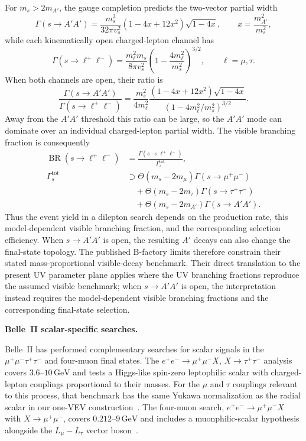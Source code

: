 \documentclass[12pt,a4paper]{article}
\begin{document}
For \(m_s>2m_{A'}\), the gauge completion predicts the two-vector partial width
\[
\Gamma(s\to A'A')
=\frac{m_s^3}{32\pi v_s^2}
\left(1-4x+12x^2\right)\sqrt{1-4x},
\qquad
x=\frac{m_{A'}^2}{m_s^2},
\]
while each kinematically open charged-lepton channel has
\[
\Gamma(s\to\ell^+\ell^-)
=\frac{m_\ell^2m_s}{8\pi v_s^2}
\left(1-\frac{4m_\ell^2}{m_s^2}\right)^{3/2},
\qquad \ell=\mu,\tau.
\]
When both channels are open, their ratio is
\[
\frac{\Gamma(s\to A'A')}{\Gamma(s\to\ell^+\ell^-)}
=
\frac{m_s^2}{4m_\ell^2}
\frac{(1-4x+12x^2)\sqrt{1-4x}}
{\left(1-4m_\ell^2/m_s^2\right)^{3/2}}.
\]
Away from the \(A'A'\) threshold this ratio can be large, so the \(A'A'\) mode can dominate over an individual charged-lepton partial width. The visible branching fraction is consequently
\[
\begin{aligned}
\operatorname{BR}(s\to\ell^+\ell^-)
&=\frac{\Gamma(s\to\ell^+\ell^-)}{\Gamma_s^{\mathrm{tot}}},\\
\Gamma_s^{\mathrm{tot}}&\supset
\Theta(m_s-2m_\mu)\Gamma(s\to\mu^+\mu^-)\\
&\quad+\Theta(m_s-2m_\tau)\Gamma(s\to\tau^+\tau^-)\\
&\quad+\Theta(m_s-2m_{A'})\Gamma(s\to A'A').
\end{aligned}
\]
Thus the event yield in a dilepton search depends on the production rate, this model-dependent visible branching fraction, and the corresponding selection efficiency. When \(s\to A'A'\) is open, the resulting \(A'\) decays can also change the final-state topology. The published B-factory limits therefore constrain their stated mass-proportional visible-decay benchmark. Their direct translation to the present UV parameter plane applies where the UV branching fractions reproduce the assumed visible benchmark; when \(s\to A'A'\) is open, the interpretation instead requires the model-dependent visible branching fractions and the corresponding final-state selection.

\noindent\textbf{Belle~II scalar-specific searches.}

Belle~II has performed complementary searches for scalar signals in the \(\mu^+\mu^-\tau^+\tau^-\) and four-muon final states. The \(e^+e^-\to\mu^+\mu^-X\), \(X\to\tau^+\tau^-\) analysis covers \(3.6\text{--}10\,\mathrm{GeV}\) and tests a Higgs-like spin-zero leptophilic scalar with charged-lepton couplings proportional to their masses. For the \(\mu\) and \(\tau\) couplings relevant to this process, that benchmark has the same Yukawa normalization as the radial scalar in our one-VEV construction~\cite{Belle-II:2023ydz}. The four-muon search, \(e^+e^-\to\mu^+\mu^-X\) with \(X\to\mu^+\mu^-\), covers \(0.212\text{--}9\,\mathrm{GeV}\) and includes a muonphilic-scalar hypothesis alongside the \(L_\mu-L_\tau\) vector boson~\cite{Belle-II:2024wtd}.
\end{document}

